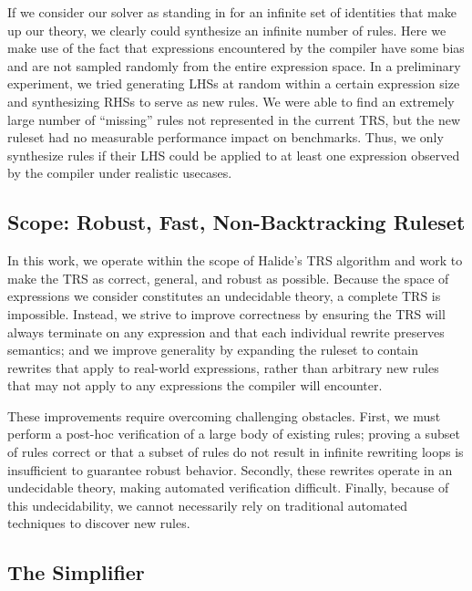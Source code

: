 If we consider our solver as standing in for an infinite set of identities that make up
our theory, we clearly could synthesize an infinite number of rules. Here we make use
of the fact that expressions encountered by the compiler have some bias 
and are not sampled randomly from the entire expression space. In a preliminary 
experiment, we tried generating LHSs at random within a certain expression size and 
synthesizing RHSs to serve as new rules. We were able to find an extremely large number of 
``missing'' rules not represented in the current TRS, but the new ruleset had 
no measurable performance impact on benchmarks. Thus, we only synthesize rules if their LHS could be 
applied to at least one expression observed by the compiler under realistic usecases. %

\subsection{Scope: Robust, Fast, Non-Backtracking Ruleset}
In this work, we operate within the scope of Halide's TRS algorithm
  and work to make the TRS as correct, general, and robust as possible.  Because
  the space of expressions we consider constitutes an undecidable theory, a complete
  TRS is impossible.  Instead, we strive to improve correctness by ensuring the TRS
  will always terminate on any expression and that each individual rewrite
  preserves semantics; and we improve generality by expanding the ruleset to
  contain rewrites that apply to real-world expressions, rather than
  arbitrary new rules that may not apply to any expressions the compiler will encounter.

These improvements require overcoming challenging obstacles.  First,
  we must perform a post-hoc verification of a large body of existing rules;
  proving a subset of rules correct or that a subset of rules do not result in infinite
  rewriting loops is insufficient to guarantee robust behavior.  Secondly,
  these rewrites operate in an undecidable theory, making automated verification
  difficult.  Finally, because of this undecidability, we cannot necessarily
  rely on traditional automated techniques to discover new rules.

\subsection{The Simplifier}
\label{sec:uses-of-trs}

